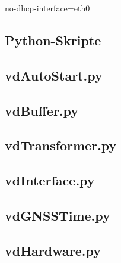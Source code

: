 \documentclass[a4paper,12pt,bibliography=totoc, listof=totoc,titlepage,pointlessnumbers]{scrreprt}
\begin{document}



\renewcommand\UrlFont\itshape

no-dhcp-interface=eth0
\listoffigures
\listoftables

\renewcommand{\appendixpagename}{\appendixname} 
\renewcommand{\appendixtocname}{\appendixname} 
\begin{appendices}

\chapter{Python-Skripte}
\label{a:skripte}
\section{vdAutoStart.py}
\label{a:vdAutoStart.py}


\section{vdBuffer.py}
\label{a:vdBuffer.py}


\section{vdTransformer.py}
\label{a:vdTransformer.py}


\section{vdInterface.py}
\label{a:vdInterface.py}


\section{vdGNSSTime.py}
\label{a:vdGNSSTime.py}


\section{vdHardware.py}
\label{a:vdHardware.py}



\end{appendices}
\end{document}
